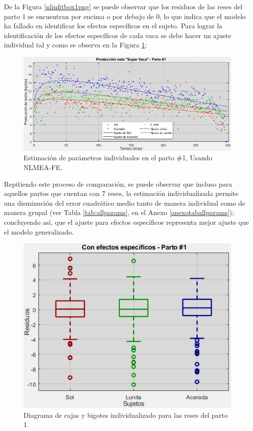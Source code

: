 De la Figura \ref{nlinfitbox1png} se puede observar que los residuos de las reses del parto 1 se encuentran por encima o por debajo de 0, lo que indica que el modelo ha fallado en identificar los efectos específicos en el sujeto. Para lograr la identificación de los efectos específicos de cada vaca se debe hacer un ajuste individual tal y como se observa en la Figura \ref{nlinfitmultiplepng}:

\begin{figure}[H]
	 \begin{center}
	 \includegraphics[scale=0.5869]{img/nlinfitmultiplespa.jpg}
	 \end{center}
	 \caption{Estimación de parámetros individuales en el parto \#1, Usando NLMEA-FE. \label{nlinfitmultiplepng}}
\end{figure}

Repitiendo este proceso de comparación, se puede observar que incluso para aquellos partos que cuentan con 7 reses, la estimación individualizada permite una disminución del  error cuadrático medio tanto de manera individual como de manera grupal (ver Tabla \ref{tab:allparams}, en el Anexo \ref{anexotaballparams}); concluyendo así, que el ajuste para efectos específicos representa mejor ajuste que el modelo generalizado. 

\begin{figure}[H]
	 \begin{center}
	 \includegraphics[scale=0.69]{img/nlinfitboxmultiplespa.jpg}
	 \end{center}
	 \caption{Diagrama de cajas y bigotes individualizado para las reses del parto 1. \label{nlinfitbox2png}}
\end{figure}

